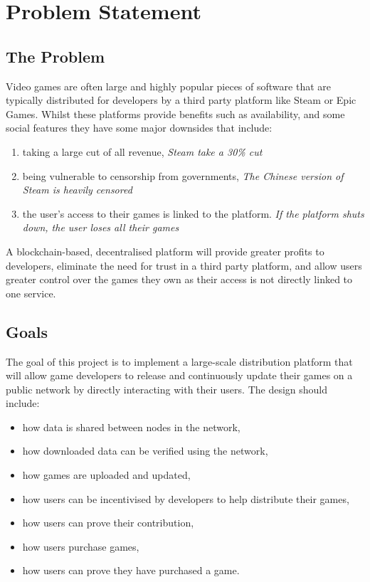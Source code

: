 
\chapter{Problem Statement}

\section{The Problem}
\label{sec:problem}

Video games are often large and highly popular pieces of software that are typically distributed for developers by a third party platform like Steam or Epic Games. Whilst these platforms provide benefits such as availability, and some social features they have some major downsides that include:
\vspace{1mm}
\begin{enumerate}[label=(\alph*)]
  \item taking a large cut of all revenue, \newline\textit{Steam take a 30\% cut}
  \item being vulnerable to censorship from governments, \newline\textit{The Chinese version of Steam is heavily censored}
  \item the user's access to their games is linked to the platform. \newline\textit{If the platform shuts down, the user loses all their games}
\end{enumerate}
\vspace{1mm}
\noindent A blockchain-based, decentralised platform will provide greater profits to developers, eliminate the need for trust in a third party platform, and allow users greater control over the games they own as their access is not directly linked to one service.

\section{Goals}

The goal of this project is to implement a large-scale distribution platform that will allow game developers to release and continuously update their games on a public network by directly interacting with their users. The design should include:
\vspace{1mm}
\begin{itemize}
  \item how data is shared between nodes in the network,
  \item how downloaded data can be verified using the network,
  \item how games are uploaded and updated,
  \item how users can be incentivised by developers to help distribute their games,
  \item how users can prove their contribution,
  \item how users purchase games,
  \item how users can prove they have purchased a game.
\end{itemize}
\vspace{1mm}

